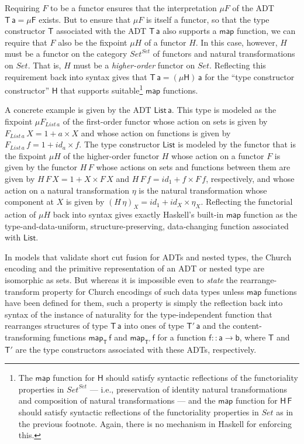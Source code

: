 \documentclass[acmsmall,screen,review,anonymous]{acmart}
\theoremstyle{definition}
\renewcommand{\id}{\mathit{id}}
\begin{document}
Requiring $F$ to be a functor ensures that the interpretation $\mu F$
of the ADT $\mathsf{T\,a} = \mathsf{\mu F}$ exists. But to ensure that
$\mu F$ is itself a functor, so that the type constructor $\mathsf{T}$
associated with the ADT $\mathsf{T\,a}$ also supports a $\mathsf{map}$
function, we can require that $F$ also be the fixpoint $\mu H$ of a
functor $H$. In this case, however, $H$ must be a functor on the
category $\mathit{Set}^\mathit{Set}$ of functors and natural
transformations on $\mathit{Set}$. That is, $H$ must be a {\em
  higher-order} functor on $\mathit{Set}$. Reflecting this requirement
back into syntax gives that $\mathsf{T\,a} = \mathsf{(\mu H)\,a}$ for
the ``type constructor constructor'' $\mathsf{H}$ that supports
suitable\footnote{The $\mathsf{map}$ function for $\mathsf{H}$ should
  satisfy syntactic reflections of the functoriality properties in
  $\mathit{Set}^\mathit{Set}$ --- i.e., preservation of identity
  natural transformations and composition of natural transformations
  --- and the $\mathsf{map}$ function for $\mathsf{H\,F}$ should
  satisfy syntactic reflections of the functoriality properties in
  $\mathit{Set}$ as in the previous footnote. Again, there is no
  mechanism in Haskell for enforcing this.} $\mathsf{map}$ functions.

A concrete example is given by the ADT $\mathsf{List\,a}$. This type
is modeled as the fixpoint $\mu F_{\mathit{List\,a}}$ of the
first-order functor whose action on sets is given by
$F_{\mathit{List}\,a}\,X = 1 + a \times X$ and whose action on
functions is given by $F_{\mathit{List}\,a}\,f = 1 + \id_a \times
f$. The type constructor $\mathsf{List}$ is modeled by the functor
that is the fixpoint $\mu H$ of the higher-order functor $H$ whose
action on a functor $F$ is given by the functor $H\,F$ whose actions
on sets and functions between them are given by $H\,F\,X = 1 + X
\times F\,X$ and $H\,F\,f = \id_1 + f \times F\,f$, respectively, and
whose action on a natural transformation $\eta$ is the natural
transformation whose component at $X$ is given by $(H\,\eta)_X = \id_1
+ \id_X \times \eta_X$. Reflecting the functorial action of $\mu H$
back into syntax gives exactly Haskell's built-in $\mathsf{map}$
function as the type-and-data-uniform, structure-preserving,
data-changing function associated with $\mathsf{List}$.

\vspace*{0.05in}

In models that validate short cut fusion for ADTs and nested types,
the Church encoding and the primitive representation of an ADT or
nested type are isomorphic as sets. But whereas it is impossible even
to {\em state} the rearrange-transform property for Church encodings
of such data types unless $\mathsf{map}$ functions have been defined
for them, such a property is simply the reflection back into syntax of
the instance of naturality for the type-independent function that
rearranges structures of type $\mathsf{T\,a}$ into ones of type
$\mathsf{T'\,a}$ and the content-transforming functions
$\mathsf{map_T\,f}$ and $\mathsf{map_{T'}\,f}$ for a function
$\mathsf{f :: a \to b}$, where $\mathsf{T}$ and $\mathsf{T'}$ are the
type constructors associated with these ADTs, respectively.
\end{document}
